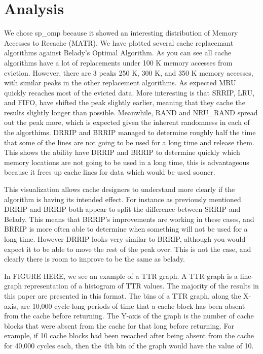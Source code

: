\section{Analysis}

We chose sp\_omp because it showed an interesting distribution of Memory Accesses to Recache (MATR).
	We have plotted several cache replacemant algorithms against Belady's Optimal Algorithm.
	As you can see all cache algorithms have a lot of replacements under 100 K memory accesses from eviction.
	However, there are 3 peaks 250 K, 300 K, and 350 K memory accesses, with similar peaks in the other replacement algorithms.
	As expected MRU quickly recaches most of the evicted data.
	More interesting is that SRRIP, LRU, and FIFO, have shifted the peak slightly earlier, meaning that they cache the results slightly longer than possible.
	Meanwhile, RAND and NRU\_RAND spread out the peak more, which is expected given the inherent randomness in each of the algorthims.
	DRRIP and BRRIP managed to determine roughly half the time that some of the lines are not going to be used for a long time and release them.
	This shows the ability have DRRIP and BRRIP to determine quickly which memory locations are not going to be used in a long time,
		this is advantageous because it frees up cache lines for data which would be used sooner.

This visualization allows cache designers to understand more clearly if the algorithm is having its intended effect.
	For instance as previously mentioned DRRIP and BRRIP both appear to split the difference between SRRIP and Belady.
	This means that BRRIP's improvements are working in these cases, and BRRIP is more often able to determine when something will not be used for a long time.
	However DRRIP looks very similar to BRRIP, although you would expect it to be able to move the rest of the peak over.
	This is not the case, and clearly there is room to improve to be the same as belady.

In FIGURE HERE, we see an example of a TTR graph.  A TTR graph is a
line-graph representation of a histogram of TTR values.  The majority
of
the results in this paper are presented in this format.  The bins of a
TTR graph, along the X-axis,  are 10,000 cycle-long periods of time
that a cache block has
been absent from the cache before returning.  The Y-axis of the graph
is the number of cache blocks that were absent from the cache for that
long before returning.  For example, if 10 cache blocks had been
recached after being absent from the cache for 40,000 cycles each,
then the 4th bin of the graph would have the value of 10.

